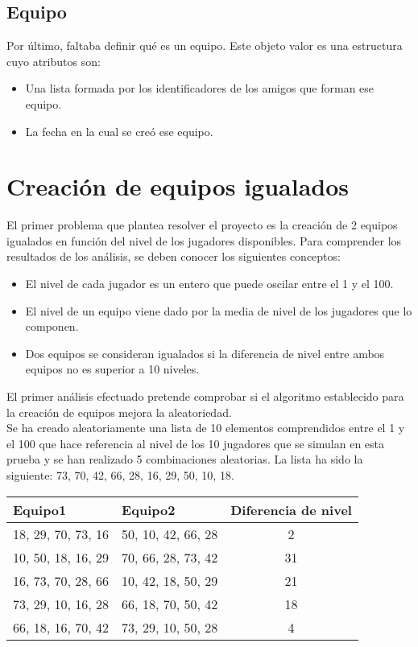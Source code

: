 \subsection{Equipo}

Por último, faltaba definir qué es un equipo. Este objeto valor es una estructura cuyo atributos son:

\begin{itemize}
    \item Una lista formada por los identificadores de los amigos que forman ese equipo.
    \item La fecha en la cual se creó ese equipo.
\end{itemize}

\section{Creación de equipos igualados}

El primer problema que plantea resolver el proyecto es la creación de 2 equipos igualados en función del nivel de los jugadores disponibles.
Para comprender los resultados de los análisis, se deben conocer los siguientes conceptos:

\begin{itemize}
    \item El nivel de cada jugador es un entero que puede oscilar entre el 1 y el 100.
    \item El nivel de un equipo viene dado por la media de nivel de los jugadores que lo componen.
    \item Dos equipos se consideran igualados si la diferencia de nivel entre ambos equipos no es superior a 10 niveles.
\end{itemize}

\newpage

El primer análisis efectuado pretende comprobar si el algoritmo establecido para la creación de equipos mejora la aleatoriedad.\\

Se ha creado aleatoriamente una lista de 10 elementos comprendidos entre el 1 y el 100 que hace referencia al nivel de los 10 jugadores
que se simulan en esta prueba y se han realizado 5 combinaciones aleatorias. La lista ha sido la siguiente:  73, 70, 42, 66, 28, 16, 29, 50, 10, 18.\\


\begin{tabular}{| l | l | c |}
    \hline
    \textbf{Equipo1} & \textbf{Equipo2} & \textbf{Diferencia de nivel}\\
    \hline
    18, 29, 70, 73, 16 & 50, 10, 42, 66, 28 & 2\\
    \hline
    10, 50, 18, 16, 29 & 70, 66, 28, 73, 42 & 31\\
    \hline
    16, 73, 70, 28, 66 & 10, 42, 18, 50, 29 & 21\\
    \hline
    73, 29, 10, 16, 28 & 66, 18, 70, 50, 42 & 18\\
    \hline
    66, 18, 16, 70, 42 & 73, 29, 10, 50, 28 & 4\\
    \hline
\end{tabular}\\


